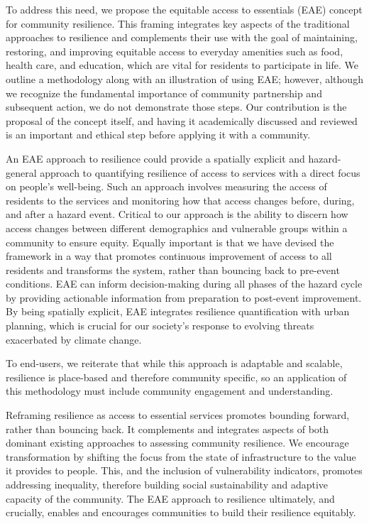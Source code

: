 \documentclass[onecolumn,doublespacing]{risa}
\begin{document}
To address this need, we propose the equitable access to essentials (EAE) concept for community resilience.
This framing integrates key aspects of the traditional approaches to resilience and complements their use with the goal of maintaining, restoring, and improving equitable access to everyday amenities such as food, health care, and education, which are vital for residents to participate in life.
We outline a methodology along with an illustration of using EAE; however, although we recognize the fundamental importance of community partnership and subsequent action, we do not demonstrate those steps.
Our contribution is the proposal of the concept itself, and having it academically discussed and reviewed is an important and ethical step before applying it with a community. 

An EAE approach to resilience could provide a spatially explicit and hazard-general approach to quantifying resilience of access to services with a direct focus on people's well-being. 
Such an approach involves measuring the access of residents to the services and monitoring how that access changes before, during, and after a hazard event. 
Critical to our approach is the ability to discern how access changes between different demographics and vulnerable groups within a community to ensure equity.
Equally important is that we have devised the framework in a way that promotes continuous improvement of access to all residents and transforms the system, rather than bouncing back to pre-event conditions.
EAE can inform decision-making during all phases of the hazard cycle by providing actionable information from preparation to post-event improvement.
By being spatially explicit, EAE integrates resilience quantification with urban planning, which is crucial for our society's response to evolving threats exacerbated by climate change.

To end-users, we reiterate that while this approach is adaptable and scalable, resilience is place-based and therefore community specific, so an application of this methodology must include community engagement and understanding.

Reframing resilience as access to essential services promotes bounding forward, rather than bouncing back. 
It complements and integrates aspects of both dominant existing approaches to assessing community resilience. 
We encourage transformation by shifting the focus from the state of infrastructure to the value it provides to people. 
This, and the inclusion of vulnerability indicators, promotes addressing inequality, therefore building social sustainability and adaptive capacity of the community.
The EAE approach to resilience ultimately, and crucially, enables and encourages communities to build their resilience equitably. 
\end{document}
